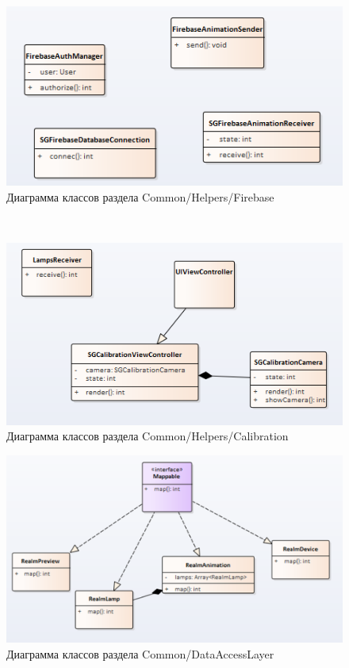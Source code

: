 \begin{figure}[H]
\centering
	\includegraphics[scale=0.5]{figures/diagrams/class/firebase.png}
	\caption{Диаграмма классов раздела Common/Helpers/Firebase}
	\label{fig:appendices:classDiagram:firebase}
\end{figure}

\newpage
~
\begin{figure}[H]
\centering
	\includegraphics[scale=0.5]{figures/diagrams/class/calibration.png}
	\caption{Диаграмма классов раздела Common/Helpers/Calibration}
	\label{fig:appendices:classDiagram:calibration}
\end{figure}

\begin{figure}[H]
\centering
	\includegraphics[scale=0.5]{figures/diagrams/class/realmData.png}
	\caption{Диаграмма классов раздела Common/DataAccessLayer}
	\label{fig:appendices:classDiagram:realmData}
\end{figure}

